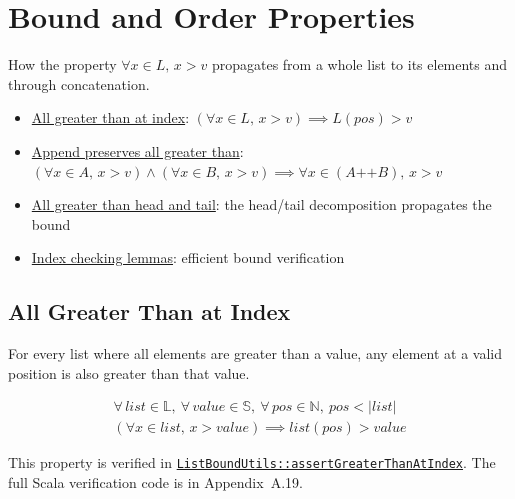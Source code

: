 \section{Bound and Order Properties}
\label{sec:bound-order}

How the property $\forall x \in L,\, x > v$ propagates from a whole list
to its elements and through concatenation.

\begin{itemize}
  \item \href{https://github.com/thiagomata/prime-numbers/blob/list-article-v1.0.0/src/main/scala/v1/chapter3/list/ListBoundUtils.scala}{All greater than at index}:
    $(\forall x \in L,\, x > v) \implies L(pos) > v$
  \item \href{https://github.com/thiagomata/prime-numbers/blob/list-article-v1.0.0/src/main/scala/v1/chapter3/list/ListBoundUtils.scala}{Append preserves all greater than}:
    $(\forall x \in A,\, x > v) \wedge (\forall x \in B,\, x > v) \implies \forall x \in (A \mathbin{\texttt{++}} B),\, x > v$
  \item \href{https://github.com/thiagomata/prime-numbers/blob/list-article-v1.0.0/src/main/scala/v1/chapter3/list/ListBoundUtils.scala}{All greater than head and tail}:
    the head/tail decomposition propagates the bound
  \item \href{https://github.com/thiagomata/prime-numbers/blob/list-article-v1.0.0/src/main/scala/v1/chapter3/list/properties/ListUtilsProperties.scala}{Index checking lemmas}:
    efficient bound verification
\end{itemize}

\subsection{All Greater Than at Index}

For every list where all elements are greater than a value, any element
at a valid position is also greater than that value.

\begin{gather*}
\forall\, list \in \mathbb{L},\ \forall\, value \in \mathbb{S},\ \forall\, pos \in \mathbb{N},\ pos < |list| \\
(\forall x \in list,\, x > value) \implies list(pos) > value
\end{gather*}

{\raggedright
This property is verified in
\href{https://github.com/thiagomata/prime-numbers/blob/list-article-v1.0.0/src/main/scala/v1/chapter3/list/ListBoundUtils.scala}{\texttt{ListBoundUtils::\allowbreak assertGreaterThanAtIndex}}.
The full Scala verification code is in Appendix~A.19.
\par}

